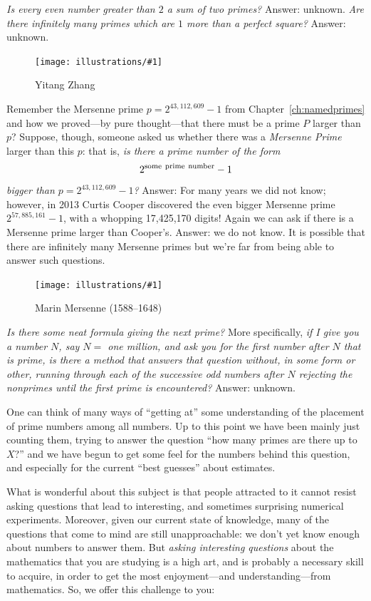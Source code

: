 \documentclass[openany]{book}
\newcommand{\ill}[3]{%
   \begin{figure}[H]%
   \vspace{-2ex}
   \centering%
   \texttt{[image: illustrations/\#1]}%
   \caption{#3}%
   \vspace{-2ex}
    \end{figure}}
\theoremstyle{plain}
\theoremstyle{definition}
\begin{document}
{\em Is every even number greater than $2$ a sum of
  two primes?}  Answer: unknown. {\em Are there infinitely many primes
  which are $1$ more than a perfect square?}  Answer: unknown.

\ill{zhang}{0.25}{Yitang Zhang\label{fig:zhang}}



Remember the Mersenne prime $p= 2^{43,112,609}-1$ from
Chapter~\ref{ch:namedprimes} and how we
proved---by pure thought---that there must be
a prime $P$ larger than $p$? Suppose, though, someone
asked us whether there was a {\it Mersenne Prime} larger than this
$p$: that is, {\em is there a prime number of the form $$2^{\rm some\
  prime\ number}-1$$ bigger than $p= 2^{43,112,609}-1$?} Answer:
For many years we did not know; however, in 2013 Curtis Cooper discovered
the even bigger Mersenne prime $2^{57,885,161}-1$, with a whopping
17,425,170 digits!  Again we can ask if there is a Mersenne
prime larger than Cooper's.  Answer: we do not know.
It is possible that there are infinitely many Mersenne primes
but we're far from being able to answer such questions.

\ill{mersenne}{.3}{Marin Mersenne (1588--1648)}



{\em Is there some neat formula giving the next prime?} More
specifically, {\em if I give you a number $N$, say $N=$ one million,
  and ask you for the first number after $N$ that is prime, is there a
  method that answers that question without, in some form or other,
  running through each of the successive odd numbers after $N$ rejecting
  the nonprimes until the first prime is encountered?}  Answer:
unknown.



One can think of many ways of ``getting at'' some understanding of the
placement of prime numbers\index{prime number} among all numbers.  Up to this point we have
been mainly just counting them, trying to answer the question ``how
many primes are there up to $X$?''  and we have begun to get some feel
for the numbers behind this question, and especially for the current
``best guesses'' about estimates.


What is wonderful about this subject is that people attracted to it
cannot resist asking questions that lead to interesting, and sometimes
surprising numerical experiments. Moreover, given our current state of
knowledge, many of the questions that come to mind are still
unapproachable: we don't yet know enough about numbers to answer them.
But {\it asking interesting questions} about the mathematics that you
are studying is a high art, and is probably a necessary skill to
acquire, in order to get the most enjoyment---and understanding---from
mathematics.  So, we offer this challenge to you:
\end{document}
